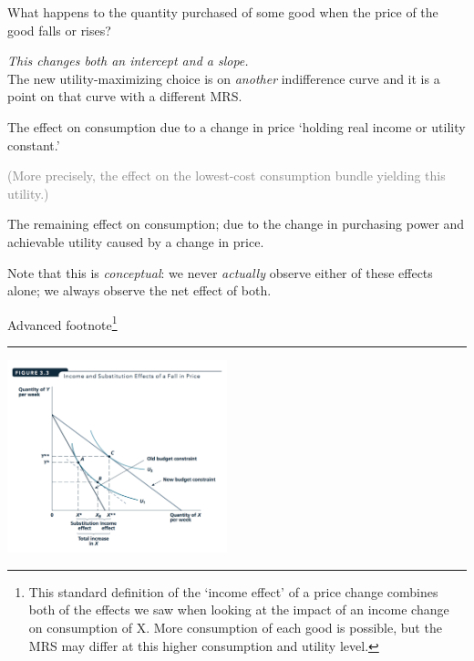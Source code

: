 \documentclass[]{article}
\providecommand{\tightlist}{%
  \setlength{\itemsep}{0pt}\setlength{\parskip}{0pt}}
\begin{document}
What happens to the quantity purchased of some good when the price of
the good falls or rises?

\emph{This changes both an intercept and a slope.}\\

The new utility-maximizing choice is on \emph{another} indifference
curve and it is a point on that curve with a different MRS.

\begin{description}
\tightlist
\item[Substitution effect (`Hicksian')]
The effect on consumption due to a change in price `holding real income
or utility constant.'
\end{description}

\textcolor{gray}{(More precisely, the effect on the lowest-cost consumption bundle yielding this utility.)}

\begin{description}
\tightlist
\item[Income effect (of a price change)]
The remaining effect on consumption; due to the change in purchasing
power and achievable utility caused by a change in price.
\end{description}

Note that this is \emph{conceptual}: we never \emph{actually} observe
either of these effects alone; we always observe the net effect of both.

\textcolor{RawSienna}{Advanced footnote}\footnote{This standard
  definition of the `income effect' of a price change combines both of
  the effects we saw when looking at the impact of an income change on
  consumption of X. More consumption of each good is possible, but the
  MRS may differ at this higher consumption and utility level.}

\begin{center}\rule{0.5\linewidth}{\linethickness}\end{center}

\includegraphics[height=2.2in]{picsfigs/incomeandsubstfx.png}
\end{document}
